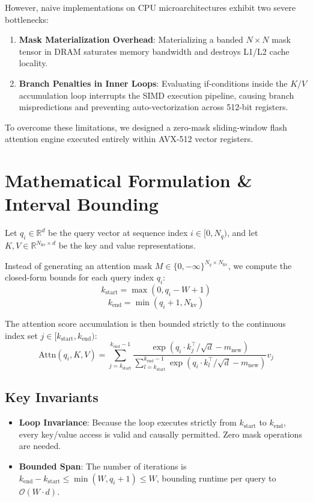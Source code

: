 \documentclass[10pt,twocolumn,letterpaper]{article}
\begin{document}
However, naive implementations on CPU microarchitectures exhibit two severe bottlenecks:
\begin{enumerate}
    \item \textbf{Mask Materialization Overhead}: Materializing a banded $N \times N$ mask tensor in DRAM saturates memory bandwidth and destroys L1/L2 cache locality.
    \item \textbf{Branch Penalties in Inner Loops}: Evaluating if-conditions inside the $K/V$ accumulation loop interrupts the SIMD execution pipeline, causing branch mispredictions and preventing auto-vectorization across 512-bit registers.
\end{enumerate}

To overcome these limitations, we designed a zero-mask sliding-window flash attention engine executed entirely within AVX-512 vector registers.

\section{Mathematical Formulation \& Interval Bounding}

Let $q_i \in \mathbb{R}^d$ be the query vector at sequence index $i \in [0, N_q)$, and let $K, V \in \mathbb{R}^{N_{\text{kv}} \times d}$ be the key and value representations.

Instead of generating an attention mask $M \in \{0, -\infty\}^{N_q \times N_{\text{kv}}}$, we compute the closed-form bounds for each query index $q_i$:
\begin{equation}
k_{\text{start}} = \max(0, q_i - W + 1)
\end{equation}
\begin{equation}
k_{\text{end}} = \min(q_i + 1, N_{\text{kv}})
\end{equation}

The attention score accumulation is then bounded strictly to the continuous index set $j \in [k_{\text{start}}, k_{\text{end}})$:
\begin{equation}
\text{Attn}(q_i, K, V) = \sum_{j=k_{\text{start}}}^{k_{\text{end}} - 1} \frac{\exp(q_i \cdot k_j^\top / \sqrt{d} - m_{\text{new}})}{\sum_{l=k_{\text{start}}}^{k_{\text{end}}-1} \exp(q_i \cdot k_l^\top / \sqrt{d} - m_{\text{new}})} v_j
\end{equation}

\subsection{Key Invariants}
\begin{itemize}
    \item \textbf{Loop Invariance}: Because the loop executes strictly from $k_{\text{start}}$ to $k_{\text{end}}$, every key/value access is valid and causally permitted. Zero mask operations are needed.
    \item \textbf{Bounded Span}: The number of iterations is $k_{\text{end}} - k_{\text{start}} \le \min(W, q_i + 1) \le W$, bounding runtime per query to $\mathcal{O}(W \cdot d)$.
\end{itemize}
\end{document}
